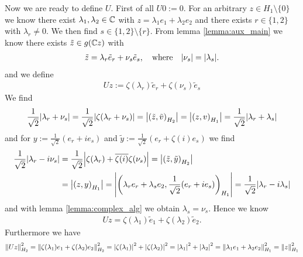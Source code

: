 \begin{example}
	Now we are ready to define $U$. First of all $U0 := 0$. For an arbitrary $z \in H_1 \setminus \{0\}$ we know there exist $\lambda_1, \lambda_2 \in \C$ with $z = \lambda_1 e_1 + \lambda_2 e_2$ and there exists $r \in \{1,2\}$ with $\lambda_r \neq 0$. We then find $s \in \{1, 2\} \setminus \{r\}$. From lemma \ref{lemma:aux_main} we know there exists $\tilde{z} \in g(\C z)$ with 
	\begin{align*}
		\tilde{z} = \lambda_r \tilde{e}_r + \nu_s \tilde{e}_s, \quad \text{where} \quad \vbraces{\nu_s} = \vbraces{\lambda_s}.
	\end{align*}
	and we define
	\begin{align*}
		Uz := \zeta(\lambda_r) \tilde{e}_r + \zeta(\nu_s) \tilde{e}_s
	\end{align*}
	We find 
	\begin{align*}
		\frac{1}{\sqrt{2}} \vbraces{\lambda_r + \nu_s} = \frac{1}{\sqrt{2}} \vbraces{\zeta(\lambda_r + \nu_s)}= \vbraces{\pbraces{\tilde{z}, \tilde{v}}_{H_2}} = \vbraces{\pbraces{z, v}_{H_1}} = \frac{1}{\sqrt{2}} \vbraces{\lambda_r + \lambda_s}
	\end{align*}
	and for $y := \frac{1}{\sqrt{2}}(e_r + ie_s)$ and $\tilde{y} := \frac{1}{\sqrt{2}} (e_r + \zeta(i) e_s)$ we find
	\begin{align*}
		\frac{1}{\sqrt{2}}\vbraces{\lambda_r - i\nu_s} &= \frac{1}{\sqrt{2}} \vbraces{\zeta(\lambda_r) + \overline{\zeta(i)} \zeta(\nu_s)}= \vbraces{\pbraces{\tilde{z}, \tilde{y}}_{H_2}} \\
		&= \vbraces{\pbraces{z, y}_{H_1}} = \vbraces{\pbraces{\lambda_r e_r + \lambda_s e_2, \frac{1}{\sqrt{2}}(e_r + ie_s)}_{H_1}} = \frac{1}{\sqrt{2}} \vbraces{\lambda_r - i\lambda_s}
	\end{align*}
	and with lemma \ref{lemma:complex_alg} we obtain $\lambda_s = \nu_s$. Hence we know
	\begin{align*}
		Uz = \zeta(\lambda_1) \tilde{e}_1 + \zeta(\lambda_2) \tilde{e}_2.
	\end{align*}
	Furthermore we have
	\begin{align*}
		\norm[H_2]{Uz}^2 = \norm[H_2]{\zeta\pbraces{\lambda_1} e_1 + \zeta\pbraces{\lambda_2} e_2}^2 = \vbraces{\zeta\pbraces{\lambda_1}}^2 + \vbraces{\zeta\pbraces{\lambda_2}}^2 = \vbraces{\lambda_1}^2 + \vbraces{\lambda_2}^2 = \norm[H_1]{\lambda_1 e_1 + \lambda_2 e_2}^2 = \norm[H_1]{z}^2
	\end{align*}
\end{example}



